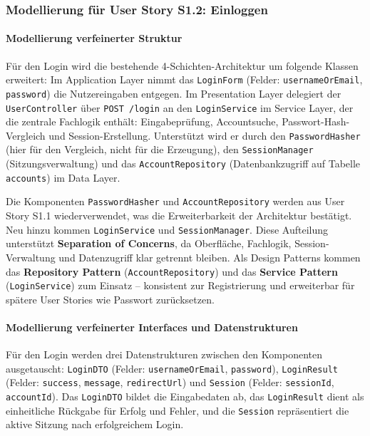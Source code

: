 \documentclass[a4paper,11pt]{article}
\begin{document}
\newpage

\subsubsection{Modellierung für User Story S1.2: Einloggen}

\paragraph{Modellierung verfeinerter Struktur}

Für den Login wird die bestehende 4-Schichten-Architektur um folgende Klassen erweitert: Im Application Layer nimmt das \texttt{LoginForm} (Felder: \texttt{usernameOrEmail}, \texttt{password}) die Nutzereingaben entgegen. Im Presentation Layer delegiert der \texttt{UserController} über \texttt{POST /login} an den \texttt{LoginService} im Service Layer, der die zentrale Fachlogik enthält: Eingabeprüfung, Accountsuche, Passwort-Hash-Vergleich und Session-Erstellung. Unterstützt wird er durch den \texttt{PasswordHasher} (hier für den Vergleich, nicht für die Erzeugung), den \texttt{SessionManager} (Sitzungsverwaltung) und das \texttt{AccountRepository} (Datenbankzugriff auf Tabelle \texttt{accounts}) im Data Layer.

Die Komponenten \texttt{PasswordHasher} und \texttt{AccountRepository} werden aus User Story S1.1 wiederverwendet, was die Erweiterbarkeit der Architektur bestätigt. Neu hinzu kommen \texttt{LoginService} und \texttt{SessionManager}. Diese Aufteilung unterstützt \textbf{Separation of Concerns}, da Oberfläche, Fachlogik, Session-Verwaltung und Datenzugriff klar getrennt bleiben. Als Design Patterns kommen das \textbf{Repository Pattern} (\texttt{AccountRepository}) und das \textbf{Service Pattern} (\texttt{LoginService}) zum Einsatz -- konsistent zur Registrierung und erweiterbar für spätere User Stories wie Passwort zurücksetzen.

\paragraph{Modellierung verfeinerter Interfaces und Datenstrukturen}

Für den Login werden drei Datenstrukturen zwischen den Komponenten ausgetauscht: \texttt{LoginDTO} (Felder: \texttt{usernameOrEmail}, \texttt{password}), \texttt{LoginResult} (Felder: \texttt{success}, \texttt{message}, \texttt{redirectUrl}) und \texttt{Session} (Felder: \texttt{sessionId}, \texttt{accountId}). Das \texttt{LoginDTO} bildet die Eingabedaten ab, das \texttt{LoginResult} dient als einheitliche Rückgabe für Erfolg und Fehler, und die \texttt{Session} repräsentiert die aktive Sitzung nach erfolgreichem Login.
\end{document}
